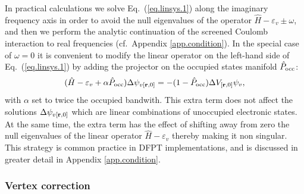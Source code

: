 \documentclass[twocolumn,prb,showpacs,superscriptaddress]{revtex4}
\def\w{\omega}
\def\H{\hat{H}}
\def\P{\hat{P}_{\rm occ}}
\def\E{\varepsilon}
\def\r{{\bf r}}
\begin{document}
In practical calculations we solve Eq.\ (\ref{eq.linsys.1}) along the imaginary
frequency axis in order to avoid the null eigenvalues of the operator
$\H-\E_v\pm\w$, and then we perform the analytic continuation of 
the screened Coulomb interaction to real frequencies (cf.\ Appendix \ref{app.condition}).
In the special case of $\w=0$ it is convenient to modify the linear operator on the left-hand side of
Eq.\ (\ref{eq.linsys.1}) by adding the projector on the occupied states manifold $\P$:
 \begin{equation} \label{eq.linsys.1b}
 (\H-\E_v+\alpha\P) \Delta \psi_{v[\r,0]}  = -(1-\P)  \Delta V_{[\r,0]} \psi_v,
  \end{equation}
with $\alpha$ set to twice the occupied bandwith. This extra term does not affect
the solutions $\Delta \psi_{v[\r,0]}$ which are linear combinations
of unoccupied electronic states. At the same time, the extra term
has the effect of shifting away from zero the null eigenvalues 
of the linear operator $\H-\E_v$ thereby making it non singular.
This strategy is common practice in DFPT implementations,\cite{baroni.rmp,espresso} and
is discussed in greater detail in Appendix \ref{app.condition}.

\subsubsection{Vertex correction}\label{sec.vertex}
\end{document}
